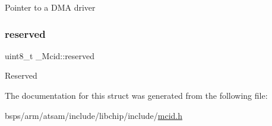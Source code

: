 Pointer to a D\+MA driver \mbox{\label{struct__Mcid_a2835e949ed391fd6560499024fea860b}} 
\subsubsection{\texorpdfstring{reserved}{reserved}}
{\footnotesize\ttfamily uint8\+\_\+t \+\_\+\+Mcid\+::reserved}

Reserved 

The documentation for this struct was generated from the following file\+:\begin{DoxyCompactItemize}
\item 
bsps/arm/atsam/include/libchip/include/\mbox{\hyperlink{mcid_8h}{mcid.\+h}}\end{DoxyCompactItemize}
